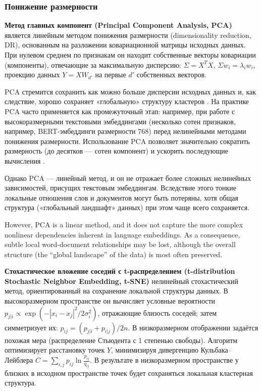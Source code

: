 \subsubsection{Понижение размерности}
\textbf{Метод главных компонент (Principal Component Analysis, PCA)} является линейным методом
понижения размерности (dimensionality reduction, DR), основанным на разложении ковариационной
матрицы исходных данных. При нулевом среднем по признакам он находит собственные векторы
ковариации (компоненты), отвечающие за максимальную дисперсию:
$\Sigma = X^T X$, $\Sigma w_i = \lambda_i w_i$, проекцию данных $Y = XW_{d'}$ на первые
$d'$ собственных векторов.

PCA стремится сохранить как можно больше дисперсии исходных данных и, как следствие, хорошо
сохраняет «глобальную» структуру кластеров \parencite{TRIMAP2019}. На практике PCA часто
применяется как промежуточный этап: например, при работе с высокоразмерными текстовыми
эмбеддингами (несколько сотен признаков, например, BERT-эмбеддинги размерности 768) перед нелинейными
методами понижения размерности. Использование PCA позволяет значительно сократить размерность
(до десятков --- сотен компонент) и ускорить последующие вычисления \parencite{huang2022towards}.

Однако PCA --- линейный метод, и он не отражает более сложных нелинейных зависимостей, присущих
текстовым эмбеддингам. Вследствие этого тонкие локальные отношения слов и документов могут
быть потеряны, хотя общая структура («глобальный ландшафт» данных) при этом чаще всего сохраняется.


However, PCA is a linear method, and it does not capture the more complex nonlinear dependencies
inherent in language embeddings. As a consequence, subtle local word-document relationships
may be lost, although the overall structure (the “global landscape” of the data) is most often
preserved.

\textbf{Стохастическое вложение соседий с t-распределением (t-distribution Stochastic Neighbor Embedding,
t-SNE)} нелинейный стохастический метод, ориентированный на сохранение локальной структуры данных. В
высокоразмерном пространстве он вычисляет условные вероятности
$p_{j|i} \propto \exp(-|x_i-x_j|^2/2\sigma_i^2)$, отражающие близость соседей; затем симметризует их:
$p_{ij}=(p_{j|i}+p_{i|j})/2n$. В низкоразмерном отображении задаётся похожая мера (распределение Стьюдента
с 1 степенью свободы). Алгоритм оптимизирует расстановку точек $Y$, минимизируя дивергенцию
Кульбака–Лейблера $C = \sum_{i,j} p_{ij}\ln\frac{p_{ij}}{q_{ij}}$. В результате в низкоразмерном пространстве
у близких в исходном пространстве точек будет сохраняться локальная кластерная структура.

